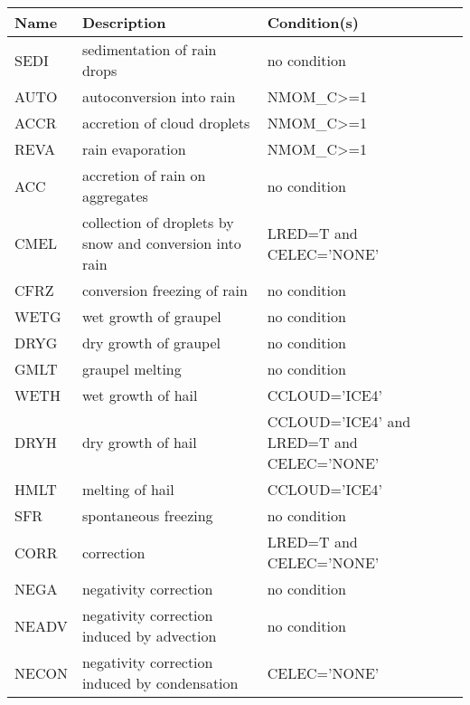 \begin{longtable} {|p{}|p{}|p{}|}
\hline
Name & Description & Condition(s) \\
\hline \hline
\endhead
SEDI   & sedimentation of rain drops                             & no condition \\\hline
AUTO   & autoconversion into rain                                & NMOM\_C>=1 \\\hline
ACCR   & accretion of cloud droplets                             & NMOM\_C>=1 \\\hline
REVA   & rain evaporation                                        & NMOM\_C>=1 \\\hline
ACC    & accretion of rain on aggregates                         & no condition \\\hline
CMEL   & collection of droplets by snow and conversion into rain & LRED=T and CELEC='NONE' \\\hline
CFRZ   & conversion freezing of rain                             & no condition \\\hline
WETG   & wet growth of graupel                                   & no condition \\\hline
DRYG   & dry growth of graupel                                   & no condition \\\hline
GMLT   & graupel melting                                         & no condition \\\hline
WETH   & wet growth of hail                                      & CCLOUD='ICE4' \\\hline
DRYH   & dry growth of hail                                      & CCLOUD='ICE4' and LRED=T and CELEC='NONE' \\\hline
HMLT   & melting of hail                                         & CCLOUD='ICE4' \\\hline
SFR    & spontaneous freezing                                    & no condition \\\hline
CORR   & correction                                              & LRED=T and CELEC='NONE' \\\hline
NEGA   & negativity correction                                   & no condition \\\hline
NEADV  & negativity correction induced by advection              & no condition \\\hline
NECON  & negativity correction induced by condensation           & CELEC='NONE' \\\hline
\end{longtable}

